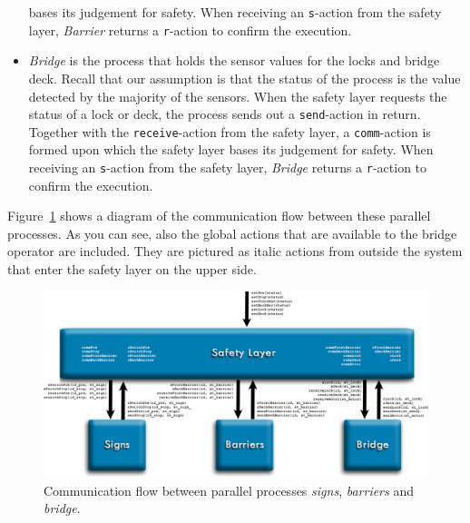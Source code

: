 \begin{itemize}
	bases its judgement for safety. When receiving an \texttt{s}-action from the safety layer, \emph{Barrier} returns a \texttt{r}-action to confirm the execution.
	\item \emph{Bridge} is the process that holds the sensor values for the locks and bridge deck. Recall that our assumption is that the status of the process is the value detected by the majority of the sensors. When the
	safety layer requests the status of a lock or deck, the process sends out a \texttt{send}-action in return. Together with the \texttt{receive}-action from the safety layer, a \texttt{comm}-action is formed upon which the safety
	layer 	bases its judgement for safety. When receiving an \texttt{s}-action from the safety layer, \emph{Bridge} returns a \texttt{r}-action to confirm the execution.
\end{itemize}
%
Figure~\ref{fig:arch} shows a diagram of the communication flow between these parallel processes. As you can see, also the global actions that are available to the bridge operator are included. They are pictured as italic actions from outside the system that enter the safety layer on the upper side.
%
\begin{figure}[htb]%
\centering
\includegraphics[width=\columnwidth, angle=90]{Images/Architecture_2}%
\caption{Communication flow between parallel processes \emph{signs}, \emph{barriers} and \emph{bridge}.}%
\label{fig:arch}%
\end{figure}
%

